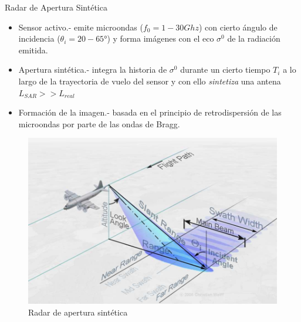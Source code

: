 \begin{frame}{Radar de Apertura Sintética}
    \footnotesize
    
    \begin{itemize}
        \item Sensor activo.- emite microondas ($f_0 = 1-30 Ghz$) con cierto ángulo de incidencia ($\theta_i = 20-65°$) y forma imágenes con el eco $\sigma^0$ de la radiación emitida.

        \item Apertura sintética.- integra la historia de $\sigma^0$ durante un cierto tiempo $T_i$ a lo largo de la trayectoria de vuelo del sensor y con ello \textit{sintetiza} una antena $L_{SAR} >> L_{real}$

        \item Formación de la imagen.- basada en el principio de retrodispersión de las microondas por parte de las ondas de Bragg.
    \end{itemize}

    \begin{figure}
        \centering
        \includegraphics[scale=0.2]{img/section_03/SLAR-geometry_p.jpg}
        \caption{Radar de apertura sintética}
        \label{fig:section_03_radar_apertura_sintetica}
    \end{figure}
\end{frame}

